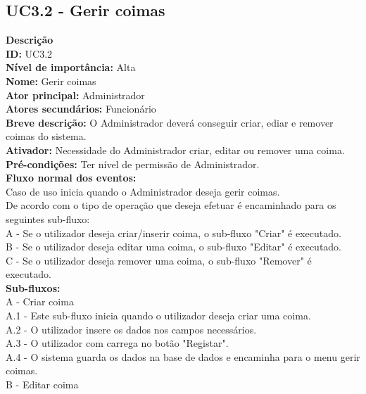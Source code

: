 \newpage

\subsection{UC3.2 - Gerir coimas}
\vspace*{5mm}

\noindent \textbf{Descrição} \\
\textbf{ID:} UC3.2 \\  
\textbf{Nível de importância:} Alta \\
\textbf{Nome:} Gerir coimas \\
\textbf{Ator principal:} Administrador \\
\textbf{Atores secundários:} Funcionário \\
\textbf{Breve descrição:} O Administrador deverá conseguir criar, ediar e remover coimas do sistema. \\ 
\textbf{Ativador:} Necessidade do Administrador criar, editar ou remover uma coima.\\
\textbf{Pré-condições:} Ter nível de permissão de Administrador. \\
\textbf{Fluxo normal dos eventos:} \\
	\indent Caso de uso inicia quando o Administrador deseja gerir coimas. \\
	\indent De acordo com o tipo de operação que deseja efetuar é encaminhado para os seguintes sub-fluxo:\\
	\indent\indent A - Se o utilizador deseja criar/inserir coima, o sub-fluxo "Criar" é executado.\\
	\indent\indent B - Se o utilizador deseja editar uma coima, o sub-fluxo "Editar" é executado.\\
	\indent\indent C - Se o utilizador deseja remover uma coima, o sub-fluxo "Remover" é executado.\\
\textbf{Sub-fluxos:} \\
	\indent A - Criar coima\\
	\indent\indent A.1 - Este sub-fluxo inicia quando o utilizador deseja criar uma coima.\\
	\indent\indent A.2 - O utilizador insere os dados nos campos necessários.\\	
	\indent\indent A.3 - O utilizador com carrega no botão "Registar".\\	
	\indent\indent A.4 - O sistema guarda os dados na base de dados e encaminha para o menu gerir coimas.\\	
	\indent B - Editar coima \\ 
